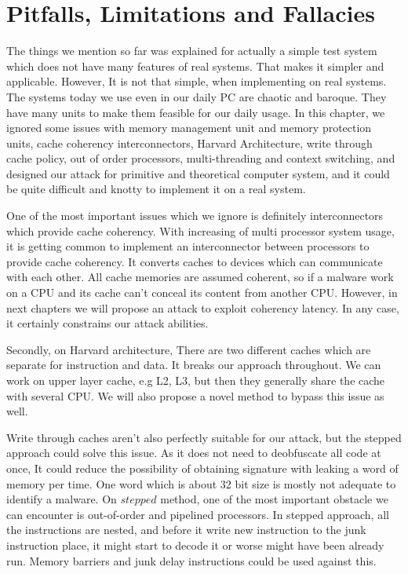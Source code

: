 \section{Pitfalls, Limitations and Fallacies}

		The things we mention so far was explained for actually a simple test system which does not have many features of real systems. That makes it simpler and applicable. However, It is not that simple, when implementing on real systems. The systems today we use even in our daily PC are chaotic and baroque. They have many units to make them feasible for our daily usage. In this chapter, we ignored some issues with memory management unit and memory protection units, cache coherency interconnectors, Harvard Architecture, write through cache policy, out of order processors, multi-threading and context switching, and designed our attack for primitive and theoretical computer system, and it could be quite difficult and knotty to implement it on a real system. 

		One of the most important issues which we ignore is definitely interconnectors which provide cache coherency. With increasing of multi processor system usage, it is getting common to implement an interconnector between processors to provide cache coherency. It converts caches to devices which can communicate with each other. All cache memories are assumed coherent, so if a malware work on a CPU and its cache can't conceal its content from another CPU. However, in next chapters we will propose an attack to exploit coherency latency. In any case, it certainly constrains our attack abilities.

		Secondly, on Harvard architecture, There are two different caches which are separate for instruction and data. It breaks our approach throughout. We can work on upper layer cache, e.g L2, L3, but then they generally share the cache with several CPU. We will also propose a novel method to bypass this issue as well.

		Write through caches aren't also perfectly suitable for our attack, but the stepped approach could solve this issue. As it does not need to deobfuscate all code at once, It could reduce the possibility of obtaining signature with leaking a word of memory per time. One word which is about 32 bit size is mostly not adequate to identify a malware. On $stepped$ method, one of the most important obstacle we can encounter is out-of-order and pipelined processors. In stepped approach, all the instructions are nested, and before it write new instruction to the junk instruction place, it might start to decode it or worse might have been already run. Memory barriers and junk delay instructions could be used against this.

